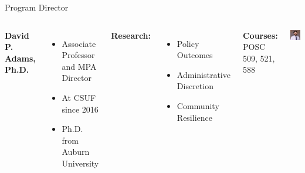 \documentclass[10pt]{beamer}
\newlength{\imageheight}
\begin{document}
    \begin{frame}{Program Director}
    \begin{columns}[t]
    \textbf{David P. Adams, Ph.D.}
    \begin{itemize}
    \item Associate Professor and MPA Director
    \item At CSUF since 2016
    \item Ph.D. from Auburn University
    \end{itemize}
    
    \textbf{Research:}
    \begin{itemize}
    \item Policy Outcomes
    \item Administrative Discretion
    \item Community Resilience
    \end{itemize}
    
    \textbf{Courses:} POSC 509, 521, 588
    
    \vspace*{0.5cm} %
    \includegraphics[height=\imageheight]{images/adams.jpg}
    \end{columns}
    \end{frame}
        
\end{document}

